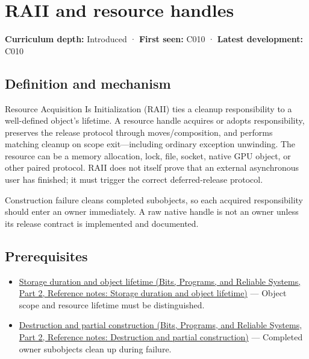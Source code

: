 \hypertarget{appendix-69739d3ab49b}{}\label{referencestart:appendix-69739d3ab49b}
\section{RAII and resource handles}\label{appendix-69739d3ab49b-raii-and-resource-handles}

\hypertarget{appendix-69739d3ab49b-raii-and-resource-handles}{}

\textbf{Curriculum depth:} Introduced · \textbf{First seen:} C010 · \textbf{Latest development:} C010

\begin{allmightroledefinition}

\subsection{Definition and mechanism}\label{appendix-69739d3ab49b-definition-and-mechanism}

\hypertarget{appendix-69739d3ab49b-definition-and-mechanism}{}

Resource Acquisition Is Initialization (RAII) ties a cleanup responsibility to a well-defined object's lifetime. A resource handle acquires or adopts responsibility, preserves the release protocol through moves/composition, and performs matching cleanup on scope exit---including ordinary exception unwinding. The resource can be a memory allocation, lock, file, socket, native GPU object, or other paired protocol. RAII does not itself prove that an external asynchronous user has finished; it must trigger the correct deferred-release protocol.

\end{allmightroledefinition}

Construction failure cleans completed subobjects, so each acquired responsibility should enter an owner immediately. A raw native handle is not an owner unless its release contract is implemented and documented.

\subsection{Prerequisites}\label{appendix-69739d3ab49b-prerequisites}

\hypertarget{appendix-69739d3ab49b-prerequisites}{}

\begin{itemize}
\tightlist
\item
  \href{../01-Bits-Programs-and-Reliable-Systems-P02/main.pdf\#nameddest=appendix-0b104bcba06b}{Storage duration and object lifetime (Bits, Programs, and Reliable Systems, Part 2, Reference notes: Storage duration and object lifetime)} --- Object scope and resource lifetime must be distinguished.
\item
  \href{../01-Bits-Programs-and-Reliable-Systems-P02/main.pdf\#nameddest=appendix-9bfe377cef7a}{Destruction and partial construction (Bits, Programs, and Reliable Systems, Part 2, Reference notes: Destruction and partial construction)} --- Completed owner subobjects clean up during failure.
\end{itemize}

